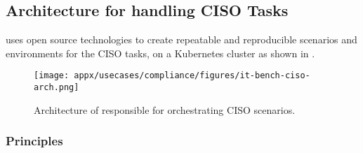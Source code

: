 \subsection{\bench Architecture for handling CISO Tasks}

\bench uses open source technologies to create repeatable and reproducible scenarios and environments for the CISO tasks, on a Kubernetes cluster as shown in .


\begin{figure*}[t!]
    \centering
    \texttt{[image: appx/usecases/compliance/figures/it-bench-ciso-arch.png]}
    \caption{Architecture of \bench responsible for orchestrating CISO scenarios.}
    \label{fig:bench_design_CISO}
\end{figure*}

\subsubsection{Principles}

